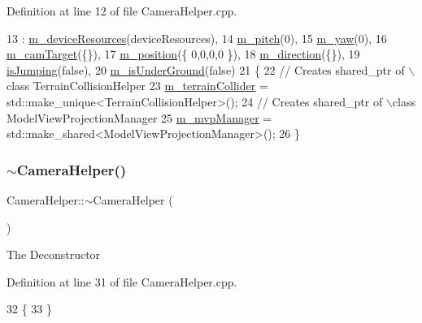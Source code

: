 Definition at line 12 of file Camera\+Helper.\+cpp.


\begin{DoxyCode}
13     : \mbox{\hyperlink{class_camera_helper_a68562f65262d3c90532df0a194624ec9}{m\_deviceResources}}(deviceResources),
14     \mbox{\hyperlink{class_camera_helper_ae2a32d581a829b05300d7298b5622469}{m\_pitch}}(0),
15     \mbox{\hyperlink{class_camera_helper_a9bdda4839839b4329188fc44517e8b01}{m\_yaw}}(0),
16     \mbox{\hyperlink{class_camera_helper_abc1a814a0b54bfcb70f3e24bcd444f01}{m\_camTarget}}(\{\}),
17     \mbox{\hyperlink{class_camera_helper_a9f225b52b05df432872e8b541079935f}{m\_position}}(\{ 0,0,0,0 \}),
18     \mbox{\hyperlink{class_camera_helper_af2822e6b05e48f33100c2f678e3776ce}{m\_direction}}(\{\}),
19     \mbox{\hyperlink{class_camera_helper_ac0dd816f2a5e8b4030b62e703ab92861}{isJumping}}(\textcolor{keyword}{false}),
20     \mbox{\hyperlink{class_camera_helper_a58fe7fb37f0bda549c7a8cc59fb58042}{m\_isUnderGround}}(\textcolor{keyword}{false})
21 \{
22     \textcolor{comment}{// Creates shared\_ptr of \(\backslash\)class TerrainCollisionHelper}
23     \mbox{\hyperlink{class_camera_helper_a5ce949723d775603a605ffcd9cc68bbc}{m\_terrainCollider}} = std::make\_unique<TerrainCollisionHelper>();
24     \textcolor{comment}{// Creates shared\_ptr of \(\backslash\)class ModelViewProjectionManager}
25     \mbox{\hyperlink{class_camera_helper_a10d96783299a8c958f84d46542a3d93f}{m\_mvpManager}} = std::make\_shared<ModelViewProjectionManager>();
26 \}
\end{DoxyCode}
\mbox{\label{class_camera_helper_af339b23a92498ca44946c589a7004837}} 
\subsubsection{\texorpdfstring{$\sim$\+Camera\+Helper()}{~CameraHelper()}}
{\footnotesize\ttfamily Camera\+Helper\+::$\sim$\+Camera\+Helper (\begin{DoxyParamCaption}{ }\end{DoxyParamCaption})}

The Deconstructor 

Definition at line 31 of file Camera\+Helper.\+cpp.


\begin{DoxyCode}
32 \{
33 \}
\end{DoxyCode}


